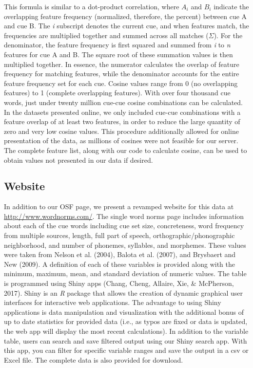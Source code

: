 \documentclass[english,,man]{apa6}
\theoremstyle{definition}
\theoremstyle{definition}
\theoremstyle{definition}
\theoremstyle{remark}
\begin{document}
This formula is similar to a dot-product correlation, where \(A_i\) and
\(B_i\) indicate the overlapping feature frequency (normalized,
therefore, the percent) between cue A and cue B. The \emph{i} subscript
denotes the current cue, and when features match, the frequencies are
multiplied together and summed across all matches (\(\Sigma\)). For the
denominator, the feature frequency is first squared and summed from
\emph{i} to \emph{n} features for cue A and B. The square root of these
summation values is then multiplied together. In essence, the numerator
calculates the overlap of feature frequency for matching features, while
the denominator accounts for the entire feature frequency set for each
cue. Cosine values range from 0 (no overlapping features) to 1 (complete
overlapping features). With over four thousand cue words, just under
twenty million cue-cue cosine combinations can be calculated. In the
datasets presented online, we only included cue-cue combinations with a
feature overlap of at least two features, in order to reduce the large
quantity of zero and very low cosine values. This procedure additionally
allowed for online presentation of the data, as millions of cosines were
not feasible for our server. The complete feature list, along with our
code to calculate cosine, can be used to obtain values not presented in
our data if desired.

\subsection{Website}\label{website}

In addition to our OSF page, we present a revamped website for this data
at \url{http://www.wordnorms.com/}. The single word norms page includes
information about each of the cue words including cue set size,
concreteness, word frequency from multiple sources, length, full part of
speech, orthographic/phonographic neighborhood, and number of phonemes,
syllables, and morphemes. These values were taken from Nelson et al.
(2004), Balota et al. (2007), and Brysbaert and New (2009). A definition
of each of these variables is provided along with the minimum, maximum,
mean, and standard deviation of numeric values. The table is programmed
using Shiny apps (Chang, Cheng, Allaire, Xie, \& McPherson, 2017). Shiny
is an \emph{R} package that allows the creation of dynamic graphical
user interfaces for interactive web applications. The advantage to using
Shiny applications is data manipulation and visualization with the
additional bonus of up to date statistics for provided data (i.e., as
typos are fixed or data is updated, the web app will display the most
recent calculations). In addition to the variable table, users can
search and save filtered output using our Shiny search app. With this
app, you can filter for specific variable ranges and save the output in
a csv or Excel file. The complete data is also provided for download.
\end{document}
